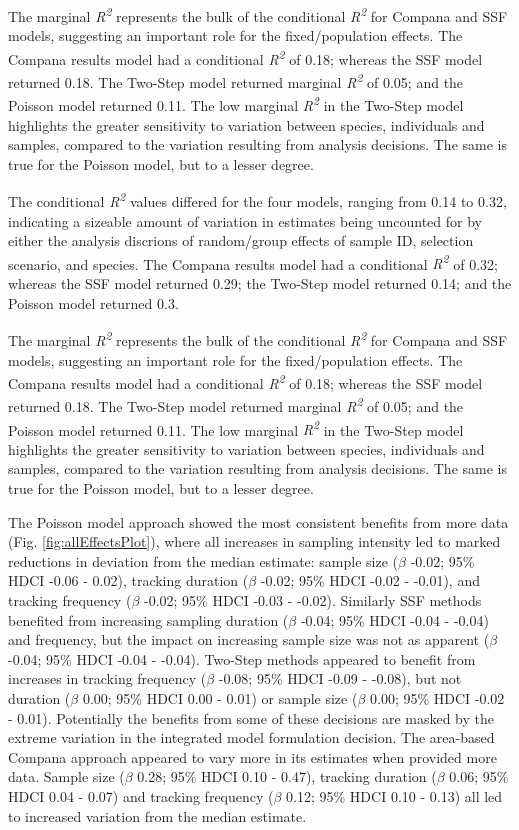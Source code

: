 \documentclass[10pt,a4paper]{article}
\begin{document}
The marginal \emph{R\textsuperscript{2}} represents the bulk of the conditional \emph{R\textsuperscript{2}} for Compana and SSF models, suggesting an important role for the fixed/population effects.
The Compana results model had a conditional \emph{R\textsuperscript{2}} of 0.18; whereas the SSF model returned 0.18.
The Two-Step model returned marginal \emph{R\textsuperscript{2}} of 0.05; and the Poisson model returned 0.11.
The low marginal \emph{R\textsuperscript{2}} in the Two-Step model highlights the greater sensitivity to variation between species, individuals and samples, compared to the variation resulting from analysis decisions.
The same is true for the Poisson model, but to a lesser degree.

The conditional \emph{R\textsuperscript{2}} values differed for the four models, ranging from 0.14 to 0.32, indicating a sizeable amount of variation in estimates being uncounted for by either the analysis discrions of random/group effects of sample ID, selection scenario, and species.
The Compana results model had a conditional \emph{R\textsuperscript{2}} of 0.32; whereas the SSF model returned 0.29; the Two-Step model returned 0.14; and the Poisson model returned 0.3.

The marginal \emph{R\textsuperscript{2}} represents the bulk of the conditional \emph{R\textsuperscript{2}} for Compana and SSF models, suggesting an important role for the fixed/population effects.
The Compana results model had a conditional \emph{R\textsuperscript{2}} of 0.18; whereas the SSF model returned 0.18.
The Two-Step model returned marginal \emph{R\textsuperscript{2}} of 0.05; and the Poisson model returned 0.11.
The low marginal \emph{R\textsuperscript{2}} in the Two-Step model highlights the greater sensitivity to variation between species, individuals and samples, compared to the variation resulting from analysis decisions.
The same is true for the Poisson model, but to a lesser degree.

The Poisson model approach showed the most consistent benefits from more data (Fig. \ref{fig:allEffectsPlot}), where all increases in sampling intensity led to marked reductions in deviation from the median estimate: sample size (\(\beta\) -0.02; 95\% HDCI -0.06 - 0.02), tracking duration (\(\beta\) -0.02; 95\% HDCI -0.02 - -0.01), and tracking frequency (\(\beta\) -0.02; 95\% HDCI -0.03 - -0.02).
Similarly SSF methods benefited from increasing sampling duration (\(\beta\) -0.04; 95\% HDCI -0.04 - -0.04) and frequency, but the impact on increasing sample size was not as apparent (\(\beta\) -0.04; 95\% HDCI -0.04 - -0.04).
Two-Step methods appeared to benefit from increases in tracking frequency (\(\beta\) -0.08; 95\% HDCI -0.09 - -0.08), but not duration (\(\beta\) 0.00; 95\% HDCI 0.00 - 0.01) or sample size (\(\beta\) 0.00; 95\% HDCI -0.02 - 0.01).
Potentially the benefits from some of these decisions are masked by the extreme variation in the integrated model formulation decision.
The area-based Compana approach appeared to vary more in its estimates when provided more data.
Sample size (\(\beta\) 0.28; 95\% HDCI 0.10 - 0.47), tracking duration (\(\beta\) 0.06; 95\% HDCI 0.04 - 0.07) and tracking frequency (\(\beta\) 0.12; 95\% HDCI 0.10 - 0.13) all led to increased variation from the median estimate.
\end{document}
